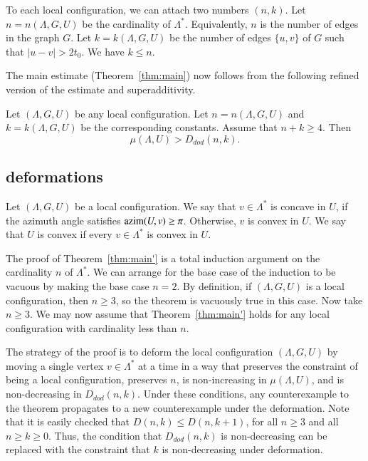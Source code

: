
To each local configuration, we can attach two numbers $(n,k)$.
Let $n=n(\Lambda,G,U)$ be the cardinality of $\Lambda^*$.  Equivalently,
$n$ is the number of edges in the graph $G$.  Let
$k=k(\Lambda,G,U)$ be the number of edges $\{u,v\}$ of $G$ such
that $|u-v|> 2t_0$. We have $k\le n$.

The main estimate (Theorem~\ref{thm:main}) now follows from the following
refined version of the estimate and superadditivity.

\begin{theorem}\label{thm:main'}  
Let $(\Lambda,G,U)$ be any local configuration.
Let $n=n(\Lambda,G,U)$ and $k=k(\Lambda,G,U)$ be the corresponding constants.
Assume that $n+k\ge 4$.  Then
   $$
   \mu(\Lambda,U) > D_{dod}(n,k).
   $$
\end{theorem}

\subsection{deformations}

Let $(\Lambda,G,U)$ be a local configuration.  We say that $v\in\Lambda^*$
is concave in $U$, if the azimuth angle satisfies
${\operatorname{azim}}(U,v)\ge\pi$.  Otherwise,
$v$ is convex in $U$.  
We say that $U$ is convex if every $v\in\Lambda^*$ is convex in
$U$.

The proof of Theorem~\ref{thm:main'} is a total induction argument
on  the cardinality $n$ of $\Lambda^*$.  We can arrange for
the base case of the induction to be vacuous by making the
base case $n=2$. By definition, if $(\Lambda,G,U)$
is a local configuration, then $n\ge 3$, so the theorem is
vacuously true in this case.  Now take $n\ge 3$. We may now assume that
Theorem~\ref{thm:main'} holds for any local configuration with
cardinality less than $n$.  

The strategy of the proof is to deform the local configuration $(\Lambda,G,U)$ by moving a single vertex $v\in\Lambda^*$ at a time in a way
that preserves the constraint of being a local configuration,
preserves $n$, 
is non-increasing in $\mu(\Lambda,U)$, 
and is non-decreasing in $D_{dod}(n,k)$.
Under these conditions, any counterexample to the theorem propagates 
to a new counterexample under the deformation.
Note that it is easily checked that $D(n,k) \le D(n,k+1)$, for all
$n\ge 3$ and all $n\ge k\ge0$.  Thus, the condition that $D_{dod}(n,k)$
is non-decreasing can be replaced with the constraint that $k$
is non-decreasing under deformation.


